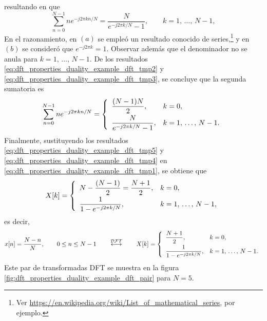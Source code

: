 \documentclass[a4paper]{report}
\begin{document}
resultando en que 
\begin{equation}\label{eq:dft_properties_duality_example_dft_tmp3}
 \sum_{n=0}^{N-1}ne^{-j2\pi kn/N}=\frac{N}{e^{-j2\pi k/N}-1},
 \qquad k=1,\,\dots,\,N-1, 
\end{equation}
En el razonamiento, en \((a)\) se empleó un resultado conocido de series,\footnote{Ver \url{https://en.wikipedia.org/wiki/List_of_mathematical_series}, por ejemplo.} y en \((b)\) se consideró que \(e^{-j2\pi k}=1\). Observar además que el denominador no se anula para \(k=1,\,\dots,\,N-1\). De los resultados \ref{eq:dft_properties_duality_example_dft_tmp2} y \ref{eq:dft_properties_duality_example_dft_tmp3}, se concluye que la segunda sumatoria es
\begin{equation}\label{eq:dft_properties_duality_example_dft_tmp4}
 \sum_{n=0}^{N-1}ne^{-j2\pi kn/N}=
 \left\{
 \begin{array}{ll}
  \dfrac{(N-1)N}{2}, & k=0,\\[\medskipamount]
  \dfrac{N}{e^{-j2\pi k/N}-1}, & k=1,\,\dots,\,N-1.
 \end{array}
 \right.  
\end{equation}
Finalmente, sustituyendo los resultados \ref{eq:dft_properties_duality_example_dft_tmp5} y \ref{eq:dft_properties_duality_example_dft_tmp4} en \ref{eq:dft_properties_duality_example_dft_tmp1}, se obtiene que 
\[
 X[k]=
 \left\{
 \begin{array}{ll}
  N-\dfrac{(N-1)}{2}=\dfrac{N+1}{2}, & k=0,\\[\medskipamount]
  \dfrac{1}{1-e^{-j2\pi k/N}}, & k=1,\,\dots,\,N-1,
 \end{array}
 \right.
\]
es decir,
\begin{equation}\label{eq:dft_properties_duality_example_dft_pair}
 x[n]=\dfrac{N-n}{N},\qquad 0\leq n\leq N-1
 \qquad\overset{\mathcal{DFT}}{\longleftrightarrow}\qquad
 X[k]=
 \left\{
 \begin{array}{ll}
  \dfrac{N+1}{2}, & k=0,\\[\medskipamount]
  \dfrac{1}{1-e^{-j2\pi k/N}}, & k=1,\,\dots,\,N-1.
 \end{array}
 \right. 
\end{equation}
Este par de transformadas DFT se muestra en la figura \ref{fig:dft_properties_duality_example_dft_pair} para \(N=5\).
\end{document}
